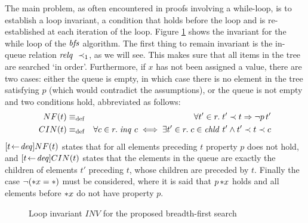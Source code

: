 The main problem, as often encountered in proofs involving a while-loop, is to
establish a loop invariant, \IE a condition that holds before the loop and is
re-established at each iteration of the loop.  Figure \ref{fig:inv} shows the
invariant for the while loop of the $\mathit{bfs}$ algorithm.  The first thing to
remain invariant is the in-queue relation $\mathit{relq}~\prec_1$, as we will see. This
makes sure that all items in the tree are searched `in order'. Furthermore, if
$x$ has not been assigned a value, there are two cases: either the queue is
empty, in which case there is no element in the tree satisfying $p$ (which would
contradict the assumptions), or the queue is not empty and two conditions hold,
abbreviated as follows:
\begin{eqnarray}
\label{eq:def-nf}
NF(t) &\equiv_{\mathrm{def}}& \forall t'\in r.\; t' \prec t \Rightarrow \lnot p\, t' \\
\label{eq:def-cin}
CIN(t) &\equiv_{\mathrm{def}}& \forall c\in r.\; \mathit{inq}~c \iff \exists t' \in r.\; c\in \mathit{chld}~t' \land t' \prec t \prec c
\end{eqnarray}
$[t \!\gets\! \mathit{deq}]NF(t)$ states that for all elements preceding $t$ property $p$ does
not hold, and $[t\!\gets\! \mathit{deq}]CIN(t)$ states that the elements in the queue are
exactly the children of elements $t'$  preceding $t$, whose children are
preceded by $t$. Finally the case $\lnot ({\ast x}=\ast)$ must be considered, where it is said
that $p\, {\ast x}$ holds and all elements before ${\ast x}$ do not have property
$p$.

\begin{figure}
\begin{center}
\end{center}
\caption[A loop invariant]{Loop invariant $INV$ for the proposed breadth-first search}
\label{fig:inv}
\end{figure}

